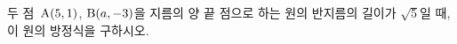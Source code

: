 두 점~$\mathrm{A}(5{,}\mkern3mu\mathopen{}1)$, $\mathrm{B}(a{,}\mkern3mu\mathopen{}-3)$을 지름의 양 끝 점으로 하는 원의 반지름의 길이가 $\sqrt{5}$일 때, 이 원의 방정식을 구하시오. 
